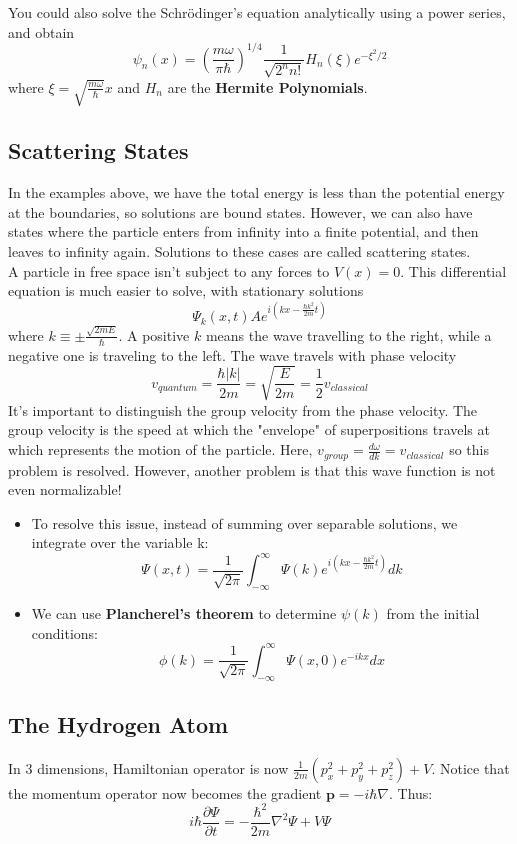 \documentclass[11pt]{article}
\begin{document}
\noindent You could also solve the Schr\"odinger's equation analytically using a power series, and obtain 
\[
    \psi_n(x) = \left(\frac{m\omega}{\pi\hbar}\right)^{1/4}\frac{1}{\sqrt{2^n n!}}H_n(\xi)e^{-\xi^2 / 2}
\]
where \(\xi = \sqrt{\frac{m\omega}{\hbar}}x \) and \(H_n\) are the \textbf{Hermite Polynomials}.


\subsection{Scattering States}
In the examples above, we have the total energy is less than the potential energy at the boundaries, so solutions are bound states. However,
we can also have states where the particle enters from infinity into a finite potential, and then leaves to infinity again. Solutions to these
cases are called scattering states.
\\

\noindent A particle in free space isn't subject to any forces to \(V(x) = 0\). This differential equation is much easier to solve,
with stationary solutions 
\[
    \Psi_k(x,t) Ae^{i\left(kx - \frac{\hbar k^2}{2m}t\right)}
\]
where \(k \equiv \pm \frac{\sqrt{2mE}}{\hbar}\). A positive \(k\) means the wave travelling to the right, while a negative one
is traveling to the left. The wave travels with phase velocity 
\[
    v_{quantum} = \frac{\hbar|k|}{2m} = \sqrt{\frac{E}{2m}} = \frac{1}{2}v_{classical}
\]
It's important to distinguish the group velocity from the phase velocity. The group velocity is the speed at which the "envelope" of
superpositions travels at which represents the motion of the particle. Here, \(v_{group} = \frac{d\omega}{dk} = v_{classical}\) so this
problem is resolved. However, another problem is that this wave function is not even normalizable!

\begin{itemize}
    \item To resolve this issue, instead of summing over separable solutions, we integrate over the variable k:
    \[
        \Psi(x,t) = \frac{1}{\sqrt{2\pi}}\int^{\infty}_{-\infty} \Psi(k)e^{i\left(kx - \frac{\hbar k^2}{2m}t\right)}dk
    \]
    \item We can use \textbf{Plancherel's theorem} to determine \(\psi(k)\) from the initial conditions:
    \[
        \phi(k) = \frac{1}{\sqrt{2\pi}}\int^{\infty}_{-\infty}\Psi(x,0)e^{-ikx}dx
    \]
       
\end{itemize}

\subsection{The Hydrogen Atom}
In 3 dimensions, Hamiltonian operator is now \(\frac{1}{2m}(p_x^2 + p_y^2 + p_z^2) + V\). Notice that the momentum operator now becomes the
gradient \(\mathbf{p} = -i\hbar \nabla\). Thus:
\[
    i\hbar \frac{\partial \Psi}{\partial t} = - \frac{\hbar^2}{2m}\nabla^2\Psi + V\Psi
\]
\end{document}
